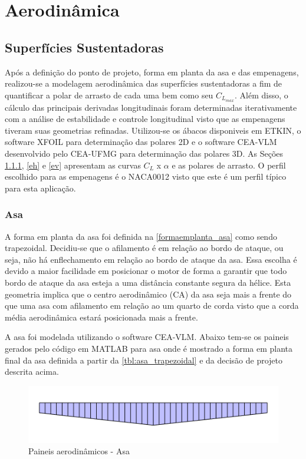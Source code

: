 \chapter{Aerodinâmica}




\section{Superfícies Sustentadoras}
\label{superf_sustentadoras}

Após a definição do ponto de projeto, forma em planta da asa e das empenagens, realizou-se a modelagem aerodinâmica das superfícies sustentadoras a fim de quantificar a polar de arrasto de cada uma bem como seu $C_{L_{max}}$. Além disso, o cálculo das principais derivadas longitudinais foram determinadas iterativamente com a análise de estabilidade e controle longitudinal visto que as empenagens tiveram suas geometrias refinadas. Utilizou-se os ábacos disponiveis em ETKIN, o software XFOIL para determinação das polares 2D e o software CEA-VLM desenvolvido pelo CEA-UFMG para determinação das polares 3D. As Seções \ref{asa}, \ref{eh} e \ref{ev}  apresentam as curvas $C_L$ x $\alpha$ e as polares de arrasto. O perfil escolhido para as empenagens é o NACA0012 visto que este é um perfil típico para esta aplicação.

\subsection{Asa}
\label{asa}
A forma em planta da asa foi definida na \autoref{formaemplanta_asa} como sendo trapezoidal. Decidiu-se que o afilamento é em relação ao bordo de ataque, ou seja, não há enflechamento em relação ao bordo de ataque da asa. Essa escolha é devido a maior facilidade em posicionar o motor de forma a garantir que todo bordo de ataque da asa esteja a uma distância constante segura da hélice. Esta geometria implica que o centro aerodinâmico (CA) da asa seja mais a frente do que uma asa com afilamento em relação ao um quarto de corda visto que a corda média aerodinâmica estará posicionada mais a frente.

A asa foi modelada utilizando o software CEA-VLM. Abaixo tem-se os paineis gerados pelo código em MATLAB para asa onde é mostrado a forma em planta final da asa definida a partir da \autoref{tbl:asa_trapezoidal} e da decisão de projeto descrita acima.

\begin{figure}[H]
\centering
\includegraphics[width=1\textwidth]{images/parte3/malha_asa.PNG}
\caption[Paineis aerodinâmicos - Asa]{Paineis aerodinâmicos - Asa}
\label{fig:malha_asa}
\end{figure}

